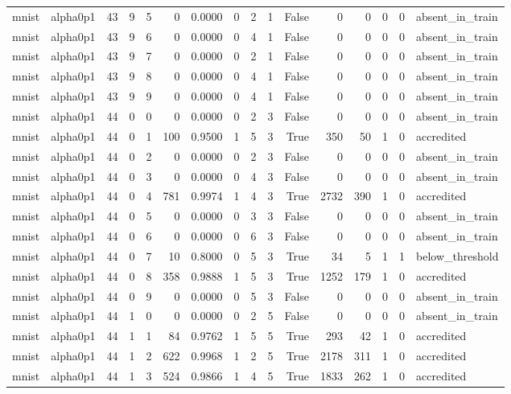 \begin{tabular}{llrrrrrrrrrrrrrl}
mnist & alpha0p1 & 43 & 9 & 5 & 0 & 0.0000 & 0 & 2 & 1 & False & 0 & 0 & 0 & 0 & absent\_in\_train \\
mnist & alpha0p1 & 43 & 9 & 6 & 0 & 0.0000 & 0 & 4 & 1 & False & 0 & 0 & 0 & 0 & absent\_in\_train \\
mnist & alpha0p1 & 43 & 9 & 7 & 0 & 0.0000 & 0 & 2 & 1 & False & 0 & 0 & 0 & 0 & absent\_in\_train \\
mnist & alpha0p1 & 43 & 9 & 8 & 0 & 0.0000 & 0 & 4 & 1 & False & 0 & 0 & 0 & 0 & absent\_in\_train \\
mnist & alpha0p1 & 43 & 9 & 9 & 0 & 0.0000 & 0 & 4 & 1 & False & 0 & 0 & 0 & 0 & absent\_in\_train \\
mnist & alpha0p1 & 44 & 0 & 0 & 0 & 0.0000 & 0 & 2 & 3 & False & 0 & 0 & 0 & 0 & absent\_in\_train \\
mnist & alpha0p1 & 44 & 0 & 1 & 100 & 0.9500 & 1 & 5 & 3 & True & 350 & 50 & 1 & 0 & accredited \\
mnist & alpha0p1 & 44 & 0 & 2 & 0 & 0.0000 & 0 & 2 & 3 & False & 0 & 0 & 0 & 0 & absent\_in\_train \\
mnist & alpha0p1 & 44 & 0 & 3 & 0 & 0.0000 & 0 & 4 & 3 & False & 0 & 0 & 0 & 0 & absent\_in\_train \\
mnist & alpha0p1 & 44 & 0 & 4 & 781 & 0.9974 & 1 & 4 & 3 & True & 2732 & 390 & 1 & 0 & accredited \\
mnist & alpha0p1 & 44 & 0 & 5 & 0 & 0.0000 & 0 & 3 & 3 & False & 0 & 0 & 0 & 0 & absent\_in\_train \\
mnist & alpha0p1 & 44 & 0 & 6 & 0 & 0.0000 & 0 & 6 & 3 & False & 0 & 0 & 0 & 0 & absent\_in\_train \\
mnist & alpha0p1 & 44 & 0 & 7 & 10 & 0.8000 & 0 & 5 & 3 & True & 34 & 5 & 1 & 1 & below\_threshold \\
mnist & alpha0p1 & 44 & 0 & 8 & 358 & 0.9888 & 1 & 5 & 3 & True & 1252 & 179 & 1 & 0 & accredited \\
mnist & alpha0p1 & 44 & 0 & 9 & 0 & 0.0000 & 0 & 5 & 3 & False & 0 & 0 & 0 & 0 & absent\_in\_train \\
mnist & alpha0p1 & 44 & 1 & 0 & 0 & 0.0000 & 0 & 2 & 5 & False & 0 & 0 & 0 & 0 & absent\_in\_train \\
mnist & alpha0p1 & 44 & 1 & 1 & 84 & 0.9762 & 1 & 5 & 5 & True & 293 & 42 & 1 & 0 & accredited \\
mnist & alpha0p1 & 44 & 1 & 2 & 622 & 0.9968 & 1 & 2 & 5 & True & 2178 & 311 & 1 & 0 & accredited \\
mnist & alpha0p1 & 44 & 1 & 3 & 524 & 0.9866 & 1 & 4 & 5 & True & 1833 & 262 & 1 & 0 & accredited \\

\end{tabular}
